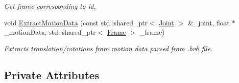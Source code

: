 \begin{DoxyCompactItemize}
\begin{DoxyCompactList}\small\item\em Get frame corresponding to id. \end{DoxyCompactList}\item 
void \hyperlink{class_motion_a8fef2b49198752e66a5f7268a6a3136b}{Extract\+Motion\+Data} (const std\+::shared\+\_\+ptr$<$ \hyperlink{struct_joint}{Joint} $>$ \&\+\_\+joint, float $\ast$\+\_\+motion\+Data, std\+::shared\+\_\+ptr$<$ \hyperlink{class_frame}{Frame} $>$ \+\_\+frame)
\begin{DoxyCompactList}\small\item\em Extracts translation/rotations from motion data parsed from .bvh file. \end{DoxyCompactList}\end{DoxyCompactItemize}
\subsection*{Private Attributes}
